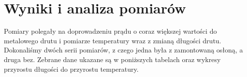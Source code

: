 \section{Wyniki i analiza pomiarów}


Pomiary polegały na doprowadzeniu prądu o coraz większej wartości do metalowego drutu
i pomiarze temperatury wraz z zmianą długości drutu.
Dokonaliśmy dwóch serii pomiarów, z czego jedna była z zamontowaną osłoną, a druga bez.
Zebrane dane ukazane są w poniższych tabelach oraz wykresy przyrostu długości do przyrostu temperatury.

